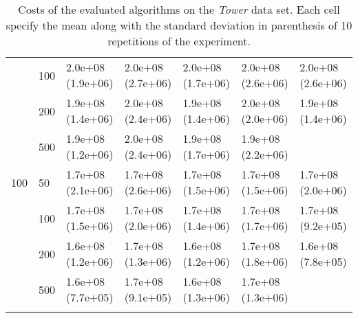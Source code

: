 \begin{longtable}{lllllll}
    & 100 &  2.0e+08 (1.9e+06) &  2.0e+08 (2.7e+06) &  2.0e+08 (1.7e+06) &    2.0e+08 (2.6e+06) &  2.0e+08 (2.6e+06) \\
    & 200 &  1.9e+08 (1.4e+06) &  2.0e+08 (2.4e+06) &  1.9e+08 (1.4e+06) &    2.0e+08 (2.0e+06) &  1.9e+08 (1.4e+06) \\
    & 500 &  1.9e+08 (1.2e+06) &  2.0e+08 (2.4e+06) &  1.9e+08 (1.7e+06) &    1.9e+08 (2.2e+06) &       \\
 \midrule
100 & 50  &  1.7e+08 (2.1e+06) &  1.7e+08 (2.6e+06) &  1.7e+08 (1.5e+06) &    1.7e+08 (1.5e+06) &  1.7e+08 (2.0e+06) \\
    & 100 &  1.7e+08 (1.5e+06) &  1.7e+08 (2.0e+06) &  1.7e+08 (1.4e+06) &    1.7e+08 (1.7e+06) &  1.7e+08 (9.2e+05) \\
    & 200 &  1.6e+08 (1.2e+06) &  1.7e+08 (1.3e+06) &  1.6e+08 (1.2e+06) &    1.7e+08 (1.8e+06) &  1.6e+08 (7.8e+05) \\
    & 500 &  1.6e+08 (7.7e+05) &  1.7e+08 (9.1e+05) &  1.6e+08 (1.3e+06) &    1.7e+08 (1.3e+06) &                 \\
\bottomrule
\caption{Costs of the evaluated algorithms on the \textit{Tower} data set. Each cell specify the mean along with the standard deviation in parenthesis of 10 repetitions of the experiment.}
\label{tab:real-cost-mean-std-tower}
\end{longtable}


